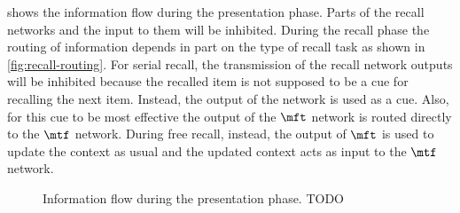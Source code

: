  shows the information flow during the presentation phase.
Parts of the recall networks and the input to them will be inhibited.
During the recall phase the routing of information depends in part on the type of recall task as shown in \cref{fig:recall-routing}.
For serial recall, the transmission of the recall network outputs will be inhibited because the recalled item is not supposed to be a cue for recalling the next item.
Instead, the output of the  network is used as a cue.
Also, for this cue to be most effective the output of the $\mft$ network is routed directly to the $\mtf$ network.
During free recall, instead, the output of $\mft$ is used to update the context as usual and the updated context acts as input to the $\mtf$ network.
\begin{figure}
    \centering
    \caption{Information flow during the presentation phase. TODO}\label{fig:pres-routing}
\end{figure}
